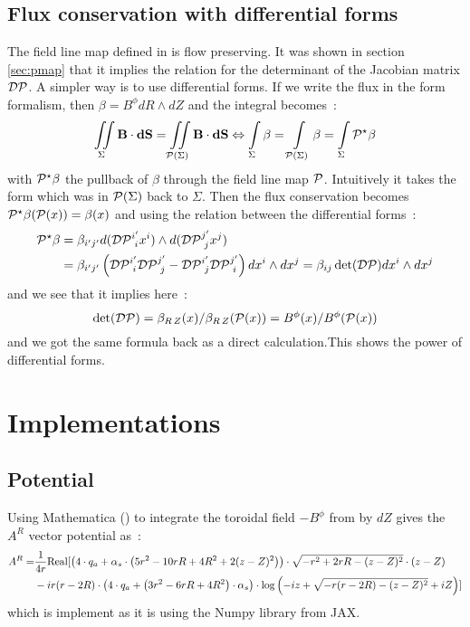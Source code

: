 \section{Flux conservation with differential forms}\label{forms}

The field line map defined in  is flow preserving. It was shown in section \ref{sec:pmap} that it implies the relation  for the determinant of the Jacobian matrix $\mathcal{D}\mathcal{P}$. 
A simpler way is to use differential forms. 
If we write the flux in the form formalism, then $\beta = B^\phi dR\wedge dZ$ and the integral becomes~:
\begin{equation*}
    \iint\limits_{\Sigma}\textbf{B}\cdot\textbf{dS} = \iint\limits_{\mathcal{P}(\Sigma)}\textbf{B}\cdot\textbf{dS} \Leftrightarrow \int\limits_{\Sigma}\beta = \int\limits_{\mathcal{P}(\Sigma)}\beta = \int\limits_{\Sigma}\mathcal{P}^\star\beta
\end{equation*}
with $\mathcal{P}^\star\beta$ the pullback of $\beta$ through the field line map $\mathcal{P}$. Intuitively it takes the form which was in $\mathcal{P}(\Sigma)$ back to $\Sigma$. Then the flux conservation becomes $\mathcal{P}^\star\beta(\mathcal{P}(x)) = \beta(x)$ and using the relation between the differential forms~:
\begin{align*}
    \mathcal{P}^\star\beta &= \beta_{i'j'}
    d(\mathcal{D}\mathcal{P}^{i'}_{\,\:i}x^i)\wedge d(\mathcal{D}\mathcal{P}^{j'}_{\,\:j}x^j)\\ &= \beta_{i'j'}\left(\mathcal{D}\mathcal{P}^{i'}_{\,\:i}\mathcal{D}\mathcal{P}^{j'}_{\,\:j}-\mathcal{D}\mathcal{P}^{i'}_{\,\:j}\mathcal{D}\mathcal{P}^{j'}_{\,\:i}\right)dx^i\wedge dx^j = \beta_{ij}\det(\mathcal{D}\mathcal{P})dx^i\wedge dx^j
\end{align*}
and we see that it implies here~:
\begin{equation*}
    \det(\mathcal{D}\mathcal{P}) = \beta_{R\,Z}(x)/\beta_{R\,Z}(\mathcal{P}(x)) = B^\phi(x)/B^\phi(\mathcal{P}(x))
\end{equation*}
and we got the same formula back as a direct calculation.This shows the power of differential forms.

\chapter{Implementations}

\section{Potential}\label{sec:jaxpot}
Using Mathematica (\citeauthor{inc_mathematica_nodate}) to integrate the toroidal field $-B^\phi$ from  by $dZ$ gives the $A^R$ vector potential as~:
\begin{align*}
    A^R = &\frac{1}{4r} \text{Real}[ \left( 4 \cdot q_a + \alpha_s \cdot \left( 5r^2 - 10rR + 4R^2 + 2(z - Z)^2 \right) \right) \cdot \sqrt{-r^2 + 2rR - (z - Z)^2} \cdot (z - Z)\\
    &- i r(r - 2R) \cdot \left( 4 \cdot q_a + \left( 3r^2 - 6rR + 4R^2 \right) \cdot \alpha_s \right) \cdot \log\left( -i z + \sqrt{-r(r - 2R) - (z - Z)^2} + i Z \right)]
\end{align*}
which is implement as it is using the Numpy library from JAX.

